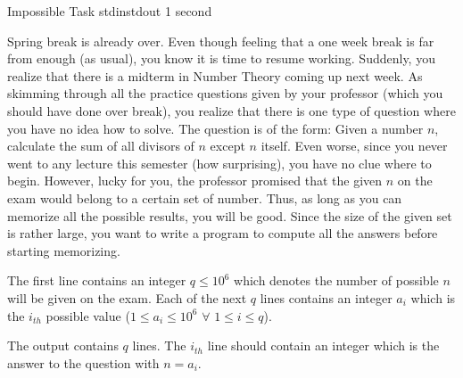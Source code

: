 \begin{problem}{Impossible Task}
{stdin}{stdout}
{1 second}{}{}

Spring break is already over. Even though feeling that a one week break is far from enough (as usual), 
you know it is time to resume working. Suddenly, you realize that there is a midterm in Number Theory
coming up next week. As skimming through all the practice questions given by your professor (which 
you should have done over break), you realize that there is one type of question where you have no idea
how to solve. The question is of the form: Given a number $n$, calculate the sum of all divisors of $n$ except
$n$ itself. Even worse, since you never went to any lecture this semester (how surprising), you have no
clue where to begin. However, lucky for you, the professor promised that the given $n$ on the exam would
belong to a certain set of number. Thus, as long as you can memorize all the possible results, you will be
good. Since the size of the given set is rather large, you want to write a program to compute all the answers before
starting memorizing.

\InputFile

The first line contains an integer $q \leq 10^6$ which denotes the number of possible $n$ will be given
on the exam. Each of the next $q$ lines contains an integer $a_i$ which is the $i_{th}$ possible value
($1 \leq a_i \leq 10^6$ $\forall$ $1 \leq i \leq q$).

\OutputFile

The output contains $q$ lines. The $i_{th}$ line should contain an integer which is the answer to the question
with $n = a_i$.

\Examples

\begin{example}
%
\end{example}

\end{problem}
